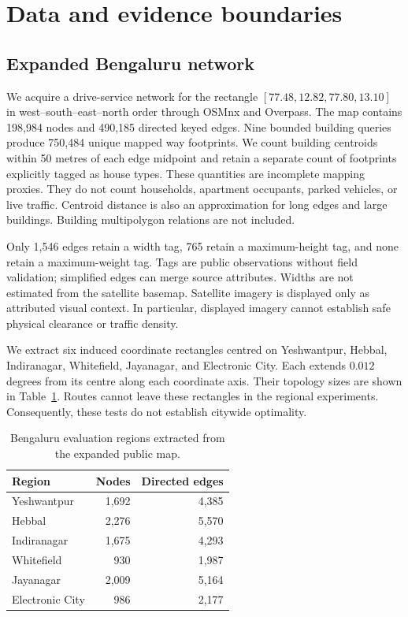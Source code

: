 \documentclass[sigconf,anonymous,review]{acmart}
\begin{document}
\section{Data and evidence boundaries}
\subsection{Expanded Bengaluru network}
We acquire a drive-service network for the rectangle $[77.48,12.82,77.80,13.10]$ in west--south--east--north order through OSMnx and Overpass. The map contains 198,984 nodes and 490,185 directed keyed edges. Nine bounded building queries produce 750,484 unique mapped way footprints. We count building centroids within 50 metres of each edge midpoint and retain a separate count of footprints explicitly tagged as house types. These quantities are incomplete mapping proxies. They do not count households, apartment occupants, parked vehicles, or live traffic. Centroid distance is also an approximation for long edges and large buildings. Building multipolygon relations are not included.

Only 1,546 edges retain a width tag, 765 retain a maximum-height tag, and none retain a maximum-weight tag. Tags are public observations without field validation; simplified edges can merge source attributes. Widths are not estimated from the satellite basemap. Satellite imagery is displayed only as attributed visual context. In particular, displayed imagery cannot establish safe physical clearance or traffic density.

We extract six induced coordinate rectangles centred on Yeshwantpur, Hebbal, Indiranagar, Whitefield, Jayanagar, and Electronic City. Each extends $0.012$ degrees from its centre along each coordinate axis. Their topology sizes are shown in Table~\ref{tab:regions}. Routes cannot leave these rectangles in the regional experiments. Consequently, these tests do not establish citywide optimality.

\begin{table}[t]
\caption{Bengaluru evaluation regions extracted from the expanded public map.}
\label{tab:regions}
\centering
\begin{tabular}{lrr}\toprule
Region & Nodes & Directed edges\\\midrule
Yeshwantpur & 1,692 & 4,385\\
Hebbal & 2,276 & 5,570\\
Indiranagar & 1,675 & 4,293\\
Whitefield & 930 & 1,987\\
Jayanagar & 2,009 & 5,164\\
Electronic City & 986 & 2,177\\\bottomrule
\end{tabular}
\end{table}
\end{document}

